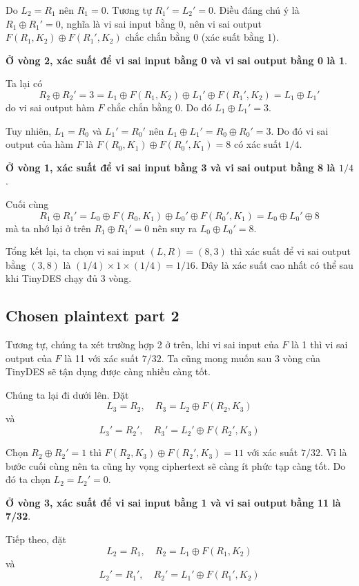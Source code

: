 \documentclass{article}
\begin{document}
Do $L_2 = R_1$ nên $R_1 = 0$. Tương tự $R_1' = L_2' = 0$. Điều đáng chú ý là 
$R_1 \oplus R_1' = 0$, nghĩa là vi sai input bằng 0, nên vi sai output 
$F(R_1, K_2) \oplus F(R_1', K_2)$ chắc chắn bằng 0 (xác suất bằng 1).

\textbf{Ở vòng 2, xác suất để vi sai input bằng 0 và vi sai output bằng 0 là 1}.

Ta lại có 
\[R_2 \oplus R_2' = 3 = L_1 \oplus F(R_1, K_2) \oplus L_1' \oplus 
F(R_1', K_2) = L_1 \oplus L_1'\]
do vi sai output hàm $F$ chắc chắn bằng 0. Do đó $L_1 \oplus L_1' = 3$.

Tuy nhiên, $L_1 = R_0$ và $L_1' = R_0'$ nên $L_1 \oplus L_1' = R_0 \oplus R_0' = 3$.
Do đó vi sai output của hàm $F$ là $F(R_0, K_1) \oplus F(R_0', K_1) = 8$ có xác suất
$1/4$. 

\textbf{Ở vòng 1, xác suất để vi sai input bằng 3 và vi sai output bằng 8 là $1/4$}.

Cuối cùng 
\[R_1 \oplus R_1' = L_0 \oplus F(R_0, K_1) \oplus L_0' \oplus F(R_0', K_1) =
L_0 \oplus L_0' \oplus 8\]
mà ta nhớ lại ở trên $R_1 \oplus R_1' = 0$ nên suy ra $L_0 \oplus L_0' = 8$.

Tổng kết lại, ta chọn vi sai input $(L, R) = (8, 3)$ thì xác suất để vi sai output
bằng $(3, 8)$ là $(1/4) \times 1 \times (1/4) = 1/16$. Đây là xác suất cao nhất
có thể sau khi TinyDES chạy đủ 3 vòng.

\subsection{Chosen plaintext part 2}

Tương tự, chúng ta xét trường hợp 2 ở trên, khi vi sai input của $F$ là 1 thì vi sai 
output của $F$ là 11 với xác suất $7/32$. Ta cũng mong muốn sau 3 vòng của TinyDES
sẽ tận dụng được càng nhiều càng tốt.

Chúng ta lại đi dưới lên. Đặt
\[L_3 = R_2, \quad R_3 = L_2 \oplus F(R_2, K_3)\]
và
\[L_3' = R_2', \quad R_3' = L_2' \oplus F(R_2', K_3)\]

Chọn $R_2 \oplus R_2' = 1$ thì $F(R_2, K_3) \oplus F(R_2', K_3) = 11$ với xác suất
$7/32$. Vì là bước cuối cùng nên ta cũng hy vọng ciphertext sẽ càng ít phức tạp càng
tốt. Do đó ta chọn $L_2 = L_2' = 0$.

\textbf{Ở vòng 3, xác suất để vi sai input bằng 1 và vi sai output bằng 11 là 7/32}.

Tiếp theo, đặt
\[L_2 = R_1, \quad R_2 = L_1 \oplus F(R_1, K_2)\]
và
\[L_2' = R_1', \quad R_2' = L_1' \oplus F(R_1', K_2)\]
\end{document}
